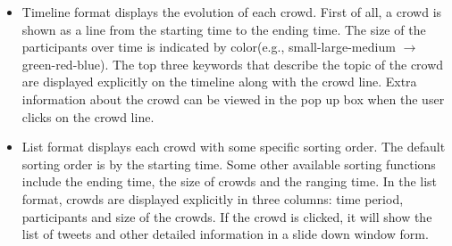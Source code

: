 \documentclass{sig-alternate}
\begin{document}
\begin{itemize}
				\item Timeline format displays the evolution of each crowd.
        First of all, a crowd is shown as a line from the starting time
        to the ending time. The size of the participants over time is
        indicated by color(e.g., small-large-medium $\longrightarrow$
        green-red-blue). The top three keywords that describe the topic of
        the crowd are displayed explicitly on the timeline along with
        the crowd line. Extra information about the crowd can be viewed
        in the pop up box when the user clicks on the crowd line.
        
        \item List format displays each crowd with some specific
        sorting order. The default sorting order is by the starting
        time. Some other available sorting functions include the
        ending time, the size of crowds and the ranging time. In the
        list format, crowds are displayed explicitly in three columns:
        time period, participants and size of the crowds. If the crowd is clicked, it will show the list
        of tweets and other detailed information in a slide down window
        form.
%

\end{itemize}
\end{document}
